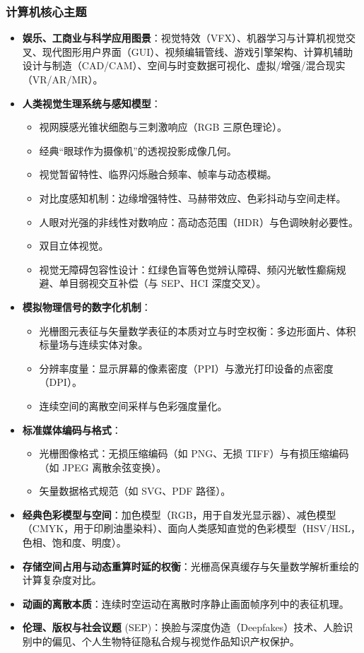 \subsubsection{计算机核心主题}
\begin{itemize}
    \item \textbf{娱乐、工商业与科学应用图景}：视觉特效（VFX）、机器学习与计算机视觉交叉、现代图形用户界面（GUI）、视频编辑管线、游戏引擎架构、计算机辅助设计与制造（CAD/CAM）、空间与时变数据可视化、虚拟/增强/混合现实（VR/AR/MR）。
    \item \textbf{人类视觉生理系统与感知模型}：
    \begin{itemize}
        \item 视网膜感光锥状细胞与三刺激响应（RGB 三原色理论）。
        \item 经典“眼球作为摄像机”的透视投影成像几何。
        \item 视觉暂留特性、临界闪烁融合频率、帧率与动态模糊。
        \item 对比度感知机制：边缘增强特性、马赫带效应、色彩抖动与空间走样。
        \item 人眼对光强的非线性对数响应：高动态范围（HDR）与色调映射必要性。
        \item 双目立体视觉。
        \item 视觉无障碍包容性设计：红绿色盲等色觉辨认障碍、频闪光敏性癫痫规避、单目弱视交互补偿（与 SEP、HCI 深度交叉）。
    \end{itemize}
    \item \textbf{模拟物理信号的数字化机制}：
    \begin{itemize}
        \item 光栅图元表征与矢量数学表征的本质对立与时空权衡：多边形面片、体积标量场与连续实体对象。
        \item 分辨率度量：显示屏幕的像素密度（PPI）与激光打印设备的点密度（DPI）。
        \item 连续空间的离散空间采样与色彩强度量化。
    \end{itemize}
    \item \textbf{标准媒体编码与格式}：
    \begin{itemize}
        \item 光栅图像格式：无损压缩编码（如 PNG、无损 TIFF）与有损压缩编码（如 JPEG 离散余弦变换）。
        \item 矢量数据格式规范（如 SVG、PDF 路径）。
    \end{itemize}
    \item \textbf{经典色彩模型与空间}：加色模型（RGB，用于自发光显示器）、减色模型（CMYK，用于印刷油墨染料）、面向人类感知直觉的色彩模型（HSV/HSL，色相、饱和度、明度）。
    \item \textbf{存储空间占用与动态重算时延的权衡}：光栅高保真缓存与矢量数学解析重绘的计算复杂度对比。
    \item \textbf{动画的离散本质}：连续时空运动在离散时序静止画面帧序列中的表征机理。
    \item \textbf{伦理、版权与社会议题} (SEP)：换脸与深度伪造（Deepfakes）技术、人脸识别中的偏见、个人生物特征隐私合规与视觉作品知识产权保护。
\end{itemize}

